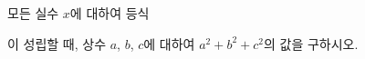 모든 실수 $x$에 대하여 등식 \par\smallskip{}\par\smallskip\noindent 이 성립할 때, 상수 $a$, $b$, $c$에 대하여 $a^2+b^2+c^2$의 값을 구하시오.

